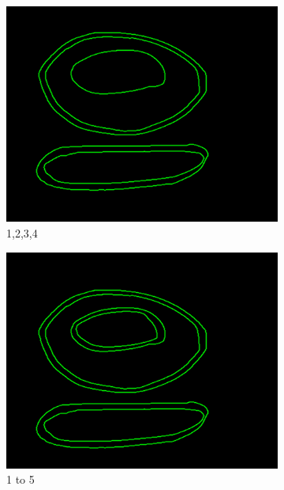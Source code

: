 \documentclass[11pt]{article}
\begin{document}
\begin{figure}[H]
	
	\begin{subfigure}[t]{0.32\textwidth}
	\centering
		\includegraphics[scale=0.28]{pics/elimination/joinedAfterRemoval4.png}
		\caption{1,2,3,4}
		\label{construction4}
	\end{subfigure}
	\begin{subfigure}[t]{0.32\textwidth}
	\centering
		\includegraphics[scale=0.28]{pics/elimination/joinedAfterRemoval5.png}
		\caption{1 to 5}
		\label{construction5}
	\end{subfigure}
	\begin{subfigure}[t]{0.32\textwidth}
	\centering

\end{subfigure}
\end{figure}
\end{document}
